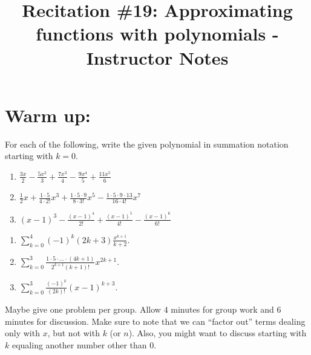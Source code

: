 \documentclass[handout,instructornotes]{ximera}
\title{Recitation \#19: Approximating functions with polynomials - Instructor Notes}
\begin{document}
\begin{abstract}		\end{abstract}
\maketitle



\section{Warm up:}
For each of the following, write the given polynomial in summation notation starting with $k=0$.
	\begin{enumerate}
	
	\item  $\frac{3x}{2} - \frac{5x^2}{3} + \frac{7x^3}{4} - \frac{9x^4}{5} + \frac{11x^5}{6}$
	
	\item  $\frac{1}{2}x + \frac{1 \cdot 5}{4 \cdot 2!}x^3 + \frac{1 \cdot 5 \cdot 9}{8 \cdot 3!}x^5 - \frac{1 \cdot 5 \cdot 9 \cdot 13}{16 \cdot 4!}x^7$
	
	\item  $(x-1)^3 - \frac{(x-1)^4}{2!} + \frac{(x-1)^5}{4!} - \frac{(x-1)^6}{6!} $
	
	\end{enumerate}
	
	\begin{freeResponse}
	\begin{enumerate}
	
	\item  $\sum_{k=0}^4 (-1)^k (2k+3) \frac{x^{k+1}}{k+2}$.  
	
	\item  $\sum_{k=0}^3 \frac{1 \cdot 5 \cdot \hdots \cdot (4k+1)}{2^{k+1} (k+1)!} x^{2k+1}.$
	
	\item  $\sum_{k=0}^3 \frac{(-1)^k}{(2k)!} (x-1)^{k+3}$.  
	
	\end{enumerate}
	\end{freeResponse}
	
\begin{instructorNotes}
Maybe give one problem per group.  
Allow $4$ minutes for group work and $6$ minutes for discussion.  
Make sure to note that we can ``factor out'' terms dealing only with $x$, but not with $k$ (or $n$).  
Also, you might want to discuss starting with $k$ equaling another number other than $0$.
\end{instructorNotes}
\end{document}
